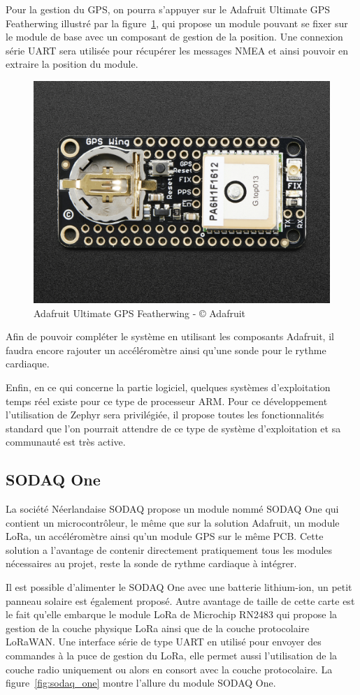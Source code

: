 Pour la gestion du GPS, on pourra s’appuyer sur le Adafruit Ultimate GPS Featherwing illustré par la figure~\ref{fig:ada_featherwing_gps}, qui propose un module pouvant se fixer sur le module de base avec un composant de gestion de la position. Une connexion série UART sera utilisée pour récupérer les messages NMEA et ainsi pouvoir en extraire la position du module.

\begin{figure}[htb]
\centering 
\includegraphics[width=0.4\columnwidth]{../images/adafruit-featherwing-ultimate-gps.jpg} 
\caption[Adafruit Featherwing GPS]{Adafruit Ultimate GPS Featherwing - © Adafruit}
\label{fig:ada_featherwing_gps}
\end{figure}

Afin de pouvoir compléter le système en utilisant les composants Adafruit, il faudra encore rajouter un accéléromètre ainsi qu’une sonde pour le rythme cardiaque.

Enfin, en ce qui concerne la partie logiciel, quelques systèmes d’exploitation temps réel existe pour ce type de processeur ARM. Pour ce développement l’utilisation de Zephyr sera privilégiée, il propose toutes les fonctionnalités standard que l’on pourrait attendre de ce type de système d’exploitation et sa communauté est très active.

\subsection{SODAQ One}

La société Néerlandaise SODAQ propose un module nommé SODAQ One qui contient un microcontrôleur, le même que sur la solution Adafruit, un module LoRa, un accéléromètre ainsi qu’un module GPS sur le même PCB. Cette solution a l’avantage de contenir directement pratiquement tous les modules nécessaires au projet, reste la sonde de rythme cardiaque à intégrer. 

Il est possible d’alimenter le SODAQ One avec une batterie lithium-ion, un petit panneau solaire est également proposé. Autre avantage de taille de cette carte est le fait qu’elle embarque le module LoRa de Microchip RN2483 qui propose la gestion de la couche physique LoRa ainsi que de la couche protocolaire LoRaWAN. Une interface série de type UART en utilisé pour envoyer des commandes à la puce de gestion du LoRa, elle permet aussi l’utilisation de la couche radio uniquement ou alors en consort avec la couche protocolaire. La figure~\ref{fig:sodaq_one} montre l'allure du module SODAQ One.

